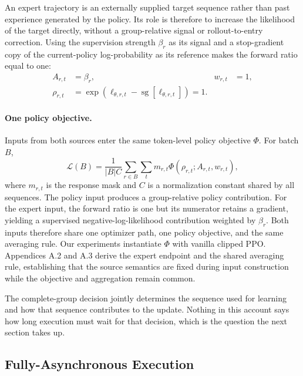 \documentclass[letterpaper]{article}
\begin{document}
An expert trajectory is an externally supplied target sequence rather than past experience generated by the policy.
Its role is therefore to increase the likelihood of the target directly, without a group-relative signal or rollout-to-entry correction.
Using the supervision strength $\beta_r$ as its signal and a stop-gradient copy of the current-policy log-probability as its reference makes the forward ratio equal to one:
\begin{equation}
\begin{aligned}
A_{r,t} &= \beta_r,
& w_{r,t} &= 1,\\
\rho_{r,t}
&= \exp\!\left(
\ell_{\theta,r,t}-\operatorname{sg}[\ell_{\theta,r,t}]
\right)=1.
\end{aligned}
\label{eq:expert-input}
\end{equation}

\paragraph{One policy objective.}
Inputs from both sources enter the same token-level policy objective $\Phi$.
For batch $B$,
\begin{equation}
\mathcal{L}(B)=\frac{1}{|B|C}
\sum_{r\in B}\sum_t m_{r,t}
\Phi\!\left(\rho_{r,t};A_{r,t},w_{r,t}\right),
\label{eq:primary-objective}
\end{equation}
where $m_{r,t}$ is the response mask and $C$ is a normalization constant shared by all sequences.
The policy input produces a group-relative policy contribution.
For the expert input, the forward ratio is one but its numerator retains a gradient, yielding a supervised negative-log-likelihood contribution weighted by $\beta_r$.
Both inputs therefore share one optimizer path, one policy objective, and the same averaging rule.
Our experiments instantiate $\Phi$ with vanilla clipped PPO.
Appendices A.2 and A.3 derive the expert endpoint and the shared averaging rule, establishing that the source semantics are fixed during input construction while the objective and aggregation remain common.

The complete-group decision jointly determines the sequence used for learning and how that sequence contributes to the update.
Nothing in this account says how long execution must wait for that decision, which is the question the next section takes up.

\subsection{Fully-Asynchronous Execution}
\label{sec:async-execution}
\end{document}
